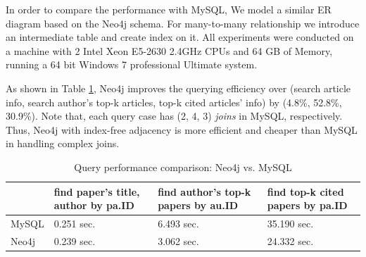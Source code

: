

 In order to compare the performance with MySQL, We model a similar ER diagram based on the Neo4j schema. For many-to-many relationship we introduce an intermediate table and create index on it. All experiments were conducted on a machine with 2 Intel Xeon E5-2630 2.4GHz CPUs and 64 GB of Memory, running a 64 bit Windows 7 professional Ultimate system.
\par
As shown in Table \ref{tab-compare}, Neo4j improves the querying efficiency over (search article info, search author's top-k articles, top-k cited articles' info) by (4.8\%, 52.8\%, 30.9\%). Note that, each query case has (2, 4, 3) {\em joins} in MySQL, respectively. Thus, Neo4j with index-free adjacency is more efficient and cheaper than MySQL in handling complex joins.






\begin{table}[t!]
\begin{center}
\caption{Query performance comparison: Neo4j vs. MySQL}
\label{tab-compare}
\begin{scriptsize}
\begin{tabular}{lp{2cm}p{2cm}p{2cm}}
\hline
{} & {find paper's title, author by pa.ID} & {find author's top-k papers by au.ID} & {find top-k cited papers by pa.ID}\\
\hline
MySQL & 0.251 sec.  & 6.493 sec. & 35.190 sec. \\
Neo4j & 0.239 sec.  & 3.062 sec. & 24.332 sec. \\
\hline
\end{tabular} \\ %
\end{scriptsize}
\end{center}
\end{table}

